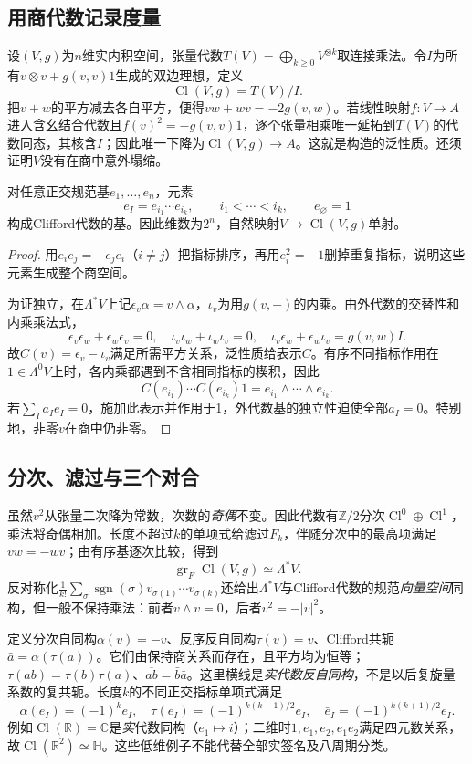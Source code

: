 \subsection{用商代数记录度量}
设$(V,g)$为$n$维实内积空间，张量代数$T(V)=\bigoplus_{k\geq0}V^{\otimes k}$取连接乘法。令$I$为所有$v\otimes v+g(v,v)1$生成的双边理想，定义
\[
 \operatorname{Cl}(V,g)=T(V)/I.
\]
把$v+w$的平方减去各自平方，便得$vw+wv=-2g(v,w)$。若线性映射$f:V\to A$进入含幺结合代数且$f(v)^2=-g(v,v)1$，逐个张量相乘唯一延拓到$T(V)$的代数同态，其核含$I$；因此唯一下降为$\operatorname{Cl}(V,g)\to A$。这就是构造的泛性质。还须证明$V$没有在商中意外塌缩。

\begin{theorem}[有序单项式基]\label{thm:clifford-basis}
对任意正交规范基$e_1,\ldots,e_n$，元素
\[
 e_I=e_{i_1}\cdots e_{i_k},\qquad i_1<\cdots<i_k,
 \qquad e_\varnothing=1
\]
构成Clifford代数的基。因此维数为$2^n$，自然映射$V\to\operatorname{Cl}(V,g)$单射。
\end{theorem}
\begin{proof}
用$e_ie_j=-e_je_i$（$i\ne j$）把指标排序，再用$e_i^2=-1$删掉重复指标，说明这些元素生成整个商空间。

为证独立，在$\Lambda^*V$上记$\epsilon_v\alpha=v\wedge\alpha$，$\iota_v$为用$g(v,-)$的内乘。由外代数的交替性和内乘乘法式，
\[
 \epsilon_v\epsilon_w+\epsilon_w\epsilon_v=0,\quad
 \iota_v\iota_w+\iota_w\iota_v=0,\quad
 \iota_v\epsilon_w+\epsilon_w\iota_v=g(v,w)I.
\]
故$C(v)=\epsilon_v-\iota_v$满足所需平方关系，泛性质给表示$C$。有序不同指标作用在$1\in\Lambda^0V$上时，各内乘都遇到不含相同指标的楔积，因此
\[
 C(e_{i_1})\cdots C(e_{i_k})1=e_{i_1}\wedge\cdots\wedge e_{i_k}.
\]
若$\sum_Ia_Ie_I=0$，施加此表示并作用于1，外代数基的独立性迫使全部$a_I=0$。特别地，非零$v$在商中仍非零。
\end{proof}

\subsection{分次、滤过与三个对合}
虽然$v^2$从张量二次降为常数，次数的\emph{奇偶}不变。因此代数有$\mathbb Z/2$分次$\operatorname{Cl}^0\oplus\operatorname{Cl}^1$，乘法将奇偶相加。长度不超过$k$的单项式给滤过$F_k$，伴随分次中的最高项满足$vw=-wv$；由有序基逐次比较，得到
\[
 \operatorname{gr}_F\operatorname{Cl}(V,g)\simeq\Lambda^*V.
\]
反对称化$\frac1{k!}\sum_\sigma\operatorname{sgn}(\sigma)v_{\sigma(1)}\cdots v_{\sigma(k)}$还给出$\Lambda^*V$与Clifford代数的规范\emph{向量空间}同构，但一般不保持乘法：前者$v\wedge v=0$，后者$v^2=-|v|^2$。

定义分次自同构$\alpha(v)=-v$、反序反自同构$\tau(v)=v$、Clifford共轭$\bar a=\alpha(\tau(a))$。它们由保持商关系而存在，且平方均为恒等；$\tau(ab)=\tau(b)\tau(a)$、$\overline{ab}=\bar b\bar a$。这里横线是\emph{实代数反自同构}，不是以后复旋量系数的复共轭。长度$k$的不同正交指标单项式满足
\[
 \alpha(e_I)=(-1)^ke_I,\quad
 \tau(e_I)=(-1)^{k(k-1)/2}e_I,\quad
 \bar e_I=(-1)^{k(k+1)/2}e_I.
\]
例如$\operatorname{Cl}(\mathbb R)=\mathbb C$是\emph{实}代数同构（$e_1\mapsto i$）；二维时$1,e_1,e_2,e_1e_2$满足四元数关系，故$\operatorname{Cl}(\mathbb R^2)\simeq\mathbb H$。这些低维例子不能代替全部实签名及八周期分类。
